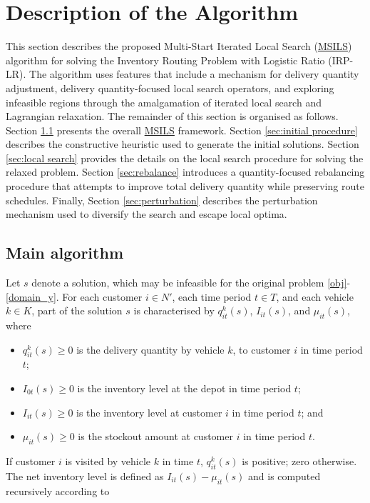 \documentclass{article}
\begin{document}
\section{Description of the Algorithm}\label{sec: alg}


This section describes the proposed Multi-Start Iterated Local Search (\hyperref[alg:MSILS]{MSILS}) algorithm for solving the Inventory Routing Problem with Logistic Ratio (IRP-LR). The algorithm uses features that include a mechanism for delivery quantity adjustment, delivery quantity-focused local search operators, and exploring infeasible regions through the amalgamation of iterated local search and Lagrangian relaxation. The remainder of this section is organised as follows. Section \ref{sec:main algorithm} presents the overall \hyperref[alg:MSILS]{MSILS} framework. Section \ref{sec:initial procedure} describes the constructive heuristic used to generate the initial solutions. Section \ref{sec:local search} provides the details on the local search procedure for solving the relaxed problem. Section \ref{sec:rebalance} introduces a quantity-focused rebalancing procedure that attempts to improve total delivery quantity while preserving route schedules. Finally, Section \ref{sec:perturbation} describes the perturbation mechanism used to diversify the search and escape local optima.

\subsection{Main algorithm} \label{sec:main algorithm}


Let $s$ denote a solution, which may be infeasible for the original problem \eqref{obj}-\eqref{domain_y}. For each customer $i\in N'$, each time period $t\in T$, and each vehicle $k\in K$, part of the solution $s$ is characterised by $q^k_{it}(s)$, $I_{it}(s)$, and $\mu_{it}(s)$, where
\begin{itemize}
    \item $q^k_{it}(s)\geq 0$ is the delivery quantity by vehicle $k$, to customer $i$ in time period $t$;
    \item $I_{0t}(s) \geq 0$ is the inventory level at the depot in time period $t$;
    \item $I_{it}(s) \geq 0$ is the inventory level at customer $i$ in time period $t$; and
    \item $\mu_{it}(s) \geq 0$ is the stockout amount at customer $i$ in time period $t$.
\end{itemize}
If customer $i$ is visited by vehicle $k$ in time $t$, $q^k_{it}(s)$ is positive; zero otherwise. The net inventory level is defined as $I_{it}(s) - \mu_{it}(s)$ and is computed recursively according to
\end{document}
